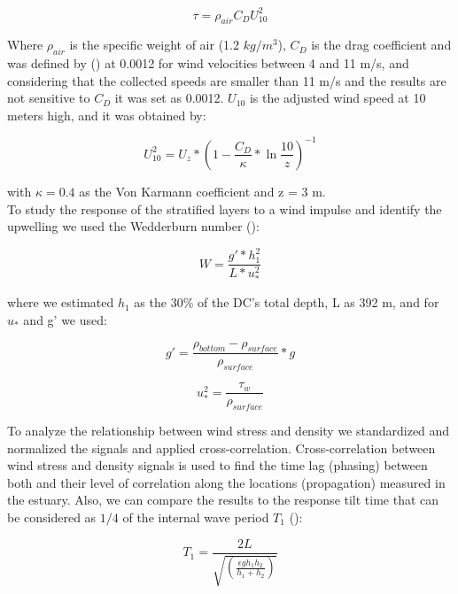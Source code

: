 \documentclass[11pt,letterpaper]{article}
\begin{document}
\begin{equation}
    \tau=\rho_{air} C_D U_{10}^2
    \label{eq: tau}
\end{equation}

Where $\rho_{air}$ is the specific weight of air (1.2 $kg/m^3$), $C_D$ is the drag coefficient and was defined by \citeauthor{large1981open} (\cite*{large1981open}) at 0.0012 for wind velocities between 4 and 11 m/s, and considering that the collected speeds are smaller than 11 m/s and the results are not sensitive to $C_D$ it was set as 0.0012. $U_{10}$ is the adjusted wind speed at 10 meters high, and it was obtained by: 

\begin{equation}
    U_{10}^2=U_z*(1-\frac{C_D}{\kappa}*\ln{\frac{10}{z}})^{-1}
    \label{eq: adjvel}
\end{equation}

with $\kappa=0.4$ as the Von Karmann coefficient and z = 3 m.\\

To study the response of the stratified layers to a wind impulse and identify the upwelling we used the Wedderburn number (\cite{Shintani2010}):

\begin{equation}
    W=\frac{g'*h_1^2}{L*u_*^2}
    \label{eq: wed}
\end{equation}

where we estimated $h_1$ as the 30\% of the DC's total depth, L as 392 m, and for $u_*$ and g' we used:

\begin{equation}
    g'=\frac{\rho_{bottom}-\rho_{surface}}{\rho_{surface}}*g
    \label{eq: redg}
\end{equation}

\begin{equation}
    u_*^2=\frac{\tau_w}{\rho_{surface}}
    \label{eq: ustar}
\end{equation}


To analyze the relationship between wind stress and density we standardized and normalized the signals and applied cross-correlation. Cross-correlation between wind stress and density signals is used to find the time lag (phasing) between both and their level of correlation along the locations (propagation) measured in the estuary. Also, we can compare the results to the response tilt time that can be considered as $1/4$ of the internal wave period $T_1$ (\cite{stevens1996initial}): 

\begin{equation}
    T_1=\frac{2L}{\sqrt{(\frac{\epsilon g h_1 h_2}{h_1 + h_2})}}
    \label{eq: period}
\end{equation}
\end{document}

